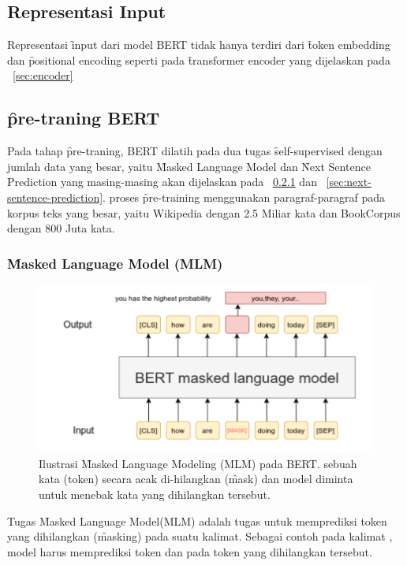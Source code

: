 \subsection{Representasi Input}
Representasi \f{input} dari model BERT tidak hanya terdiri dari \f{token embedding} dan \f{positional encoding} seperti pada \f{transformer encoder} yang dijelaskan pada \sect~\ref{sec:encoder}
	
	\subsection{\f{pre-traning} BERT}

	Pada tahap \f{pre-traning}, BERT dilatih pada dua tugas \f{self-supervised} dengan jumlah data yang besar, yaitu \f{Masked Language Model} dan \f{Next Sentence Prediction} yang masing-masing akan dijelaskan pada \sect~\ref{sec:masked-language-model} dan \sect~\ref{sec:next-sentence-prediction}. proses \f{pre-training} menggunakan paragraf-paragraf pada korpus teks yang besar, yaitu Wikipedia dengan 2.5 Miliar kata dan BookCorpus dengan 800 Juta kata.


	\subsubsection{\f{Masked Language Model} (MLM)}
	\label{sec:masked-language-model}

	\begin{figure}
		\centering
		\includegraphics[width=1\textwidth]{assets/pics/MLM.png}
		\caption{Ilustrasi \f{Masked Language Modeling} (MLM) pada BERT. sebuah kata (token) secara acak di-hilangkan (\f{mask}) dan model diminta untuk menebak kata yang dihilangkan tersebut.}
		\label{fig:masked-language-model}
	\end{figure}

	Tugas \f{Masked Language Model}(MLM) adalah tugas untuk memprediksi token yang dihilangkan (\f{masking}) pada suatu kalimat. Sebagai contoh pada kalimat , model harus memprediksi token  dan  pada token yang dihilangkan tersebut. 

